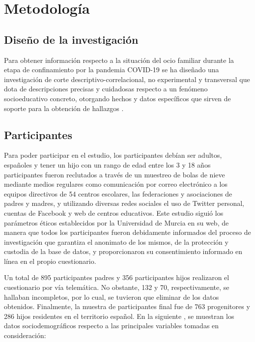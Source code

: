 \documentclass[spanish]{textolivre}
\begin{document}
\section{Metodología}
\subsection{Diseño de la investigación}
Para obtener información respecto a la situación del ocio familiar durante la etapa de confinamiento por la pandemia COVID-19 se ha diseñado una investigación de corte descriptivo-correlacional, no experimental y transversal que dota de descripciones precisas y cuidadosas respecto a un fenómeno socioeducativo concreto, otorgando hechos y datos específicos que sirven de soporte para la obtención de hallazgos \cite{bisquerra2004}. 

\subsection{Participantes}
Para poder participar en el estudio, los participantes debían ser adultos, españoles y tener un hijo con un rango de edad entre los 3 y 18 años participantes fueron reclutados a través de un muestreo de bolas de nieve mediante medios regulares como comunicación por correo electrónico a los equipos directivos de 54 centros escolares, las federaciones y asociaciones de padres y madres, y utilizando diversas redes sociales  el uso de Twitter personal, cuentas de Facebook y web de centros educativos. Este estudio siguió los parámetros éticos establecidos por la Universidad de Murcia en su web, de manera que todos los participantes fueron debidamente informados del proceso de investigación que garantiza el anonimato de los mismos, de la protección y custodia de la base de datos, y proporcionaron su consentimiento informado en línea en el propio cuestionario.

Un total de 895 participantes padres y 356 participantes hijos realizaron el cuestionario por vía telemática. No obstante, 132 y 70, respectivamente, se hallaban incompletos, por lo cual, se tuvieron que eliminar de los datos obtenidos. Finalmente, la muestra de participantes final fue de 763 progenitores y 286 hijos residentes en el territorio español. En la siguiente , se muestran los datos sociodemográficos respecto a las principales variables tomadas en consideración: 
\end{document}
